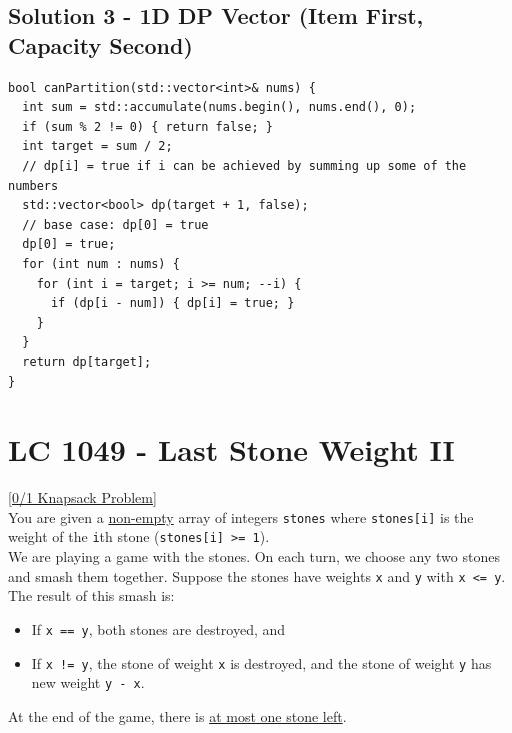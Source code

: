 \subsection*{Solution 3 - 1D DP Vector (Item First, Capacity Second)}
\begin{lstlisting}
bool canPartition(std::vector<int>& nums) {
  int sum = std::accumulate(nums.begin(), nums.end(), 0);
  if (sum % 2 != 0) { return false; }
  int target = sum / 2;
  // dp[i] = true if i can be achieved by summing up some of the numbers
  std::vector<bool> dp(target + 1, false);
  // base case: dp[0] = true
  dp[0] = true;
  for (int num : nums) {
    for (int i = target; i >= num; --i) {
      if (dp[i - num]) { dp[i] = true; }
    }
  }
  return dp[target];
}
\end{lstlisting}

\section{LC 1049 - Last Stone Weight II}\label{lc1049}
{\hyperref[subsubsec:01_knapsack_oj_problems]{[0/1 Knapsack Problem]}} \\

You are given a \ul{non-empty} array of integers {\colorbox{CodeBackground}{\lstinline|stones|}} where {\colorbox{CodeBackground}{\lstinline|stones[i]|}} is the weight of the {\colorbox{CodeBackground}{\lstinline|i|}}th stone ({\colorbox{CodeBackground}{\lstinline|stones[i] >= 1|}}).\\

We are playing a game with the stones. On each turn, we choose any two stones and smash them together. Suppose the stones have weights {\colorbox{CodeBackground}{\lstinline|x|}} and {\colorbox{CodeBackground}{\lstinline|y|}} with {\colorbox{CodeBackground}{\lstinline|x <= y|}}. The result of this smash is:
\begin{itemize}
\item If {\colorbox{CodeBackground}{\lstinline|x == y|}}, both stones are destroyed, and
\item If {\colorbox{CodeBackground}{\lstinline|x != y|}}, the stone of weight {\colorbox{CodeBackground}{\lstinline|x|}} is destroyed, and the stone of weight {\colorbox{CodeBackground}{\lstinline|y|}} has new weight {\colorbox{CodeBackground}{\lstinline|y - x|}}.
\end{itemize}

At the end of the game, there is \ul{at most one stone left}.\\

